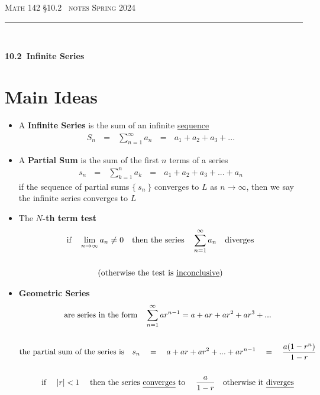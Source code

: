 \documentclass{article}
\def\chapt{10.2}
\def\chaptname{Infinite Series}
\begin{document}
\noindent
{\scshape Math 142} \hfill {\scshape \S\chapt~ notes} \hfill {\scshape Spring 2024}

\smallskip

\hrule

\bigskip

\hfill
\\

\thispagestyle{empty}

{
\huge
\noindent
\textbf{\chapt~\chaptname}
}

\section*{Main Ideas}

\begin{itemize}

\item
A \textbf{Infinite Series} is the sum of an infinite \underline{sequence}
\begin{gather*}
S_n ~~~=~~~
\sum_{n=1}^{\infty} a_n
~~~=~~~
a_1 + a_2 + a_3 + ...
\end{gather*}

\item A \textbf{Partial Sum} is the sum of the first $n$ terms of a series
\begin{gather*}
s_n ~~~=~~~
\sum_{k=1}^n a_k
~~~=~~~
a_1 + a_2 + a_3 + ... + a_n
\end{gather*}
if the sequence of partial sums $\{~s_n~\}$ converges to $L$ as $n \to \infty$,
then we say the infinite series converges to $L$
\\

\item
The \textbf{$N$-th term test}
\begin{gather*}
\text{if}~~~
\lim_{n \to \infty} a_n \neq 0
~~~\text{then the series}~~~
\sum_{n=1}^{\infty} a_n
~~~\text{diverges}
\\
\\
\text{(otherwise the test is \underline{inconclusive})}
\\
\end{gather*}

\item
\textbf{Geometric Series}
\begin{gather*}
\text{are series in the form}~~~
\sum_{n=1}^{\infty} ar^{n-1}=a+ar+ar^2+ar^3+...
\\
\\
\text{the partial sum of the series is}~~~
s_n ~~~=~~~ a+ar+ar^2+...+ar^{n-1}~~~=~~~\frac{a(1-r^n)}{1-r}
\\
\\
\text{if }~~~ |r|<1 ~~~\text{ then the series \underline{converges} to }~~~
\frac{a}{1-r}
~~~\text{otherwise it \underline{diverges}}
\end{gather*}

\end{itemize}
\end{document}
